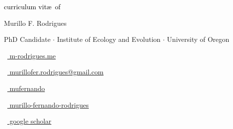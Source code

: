 \begin{scriptsize}
	 \textcolor{black}{curriculum vit\ae~of}
\end{scriptsize}

\vspace*{-0.10em}
\begin{Large} 
    Murillo F. Rodrigues	
\end{Large}

\vspace*{0.25em}
\begin{scshape}
	\begin{footnotesize}
		  \textcolor{highlight2}{PhD Candidate $\cdot$ Institute of Ecology and Evolution $\cdot$ University of Oregon}
		  
	\end{footnotesize}
\end{scshape}
\vspace*{0.4cm}

\begin{footnotesize}
	\begin{tiny}\faHome\end{tiny}~\href{https://m-rodrigues.me}{
		m-rodrigues.me
	}
	\quad \begin{tiny}\faEnvelope[regular]\end{tiny}~\href{mailto:murillofer.rodrigues@gmail.com}{%
		murillofer.rodrigues@gmail.com
	} 
	
	\begin{tiny}\faGithub\end{tiny}~\href{https://github.com/mufernando}{
		mufernando
	} 
	\quad 
	\begin{tiny}\faLinkedinIn\end{tiny}~\href{https://www.linkedin.com/in/murillo-fernando-rodrigues-28162b106/}{
		murillo-fernando-rodrigues
	}
	\quad 
	\begin{tiny}\faGraduationCap\end{tiny}~\href{https://scholar.google.com/citations?user=GyBZOK0AAAAJ&hl=en}{
		 google scholar
		}

\end{footnotesize}
